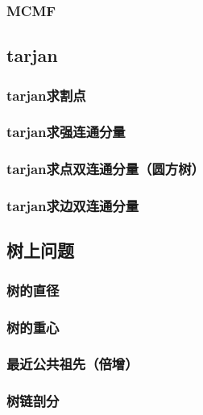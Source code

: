 \documentclass[10pt,a4paper]{article}
\begin{document}
\subsubsection{MCMF}

\subsection{tarjan}
\subsubsection{tarjan求割点}
\begin{spacing}{1.5}

\end{spacing}

\subsubsection{tarjan求强连通分量}
\begin{spacing}{1.5}

\end{spacing}

\subsubsection{tarjan求点双连通分量（圆方树）}

\subsubsection{tarjan求边双连通分量}

\subsection{树上问题}
\subsubsection{树的直径}

\subsubsection{树的重心}

\subsubsection{最近公共祖先（倍增）}

\subsubsection{树链剖分}

\end{document}
